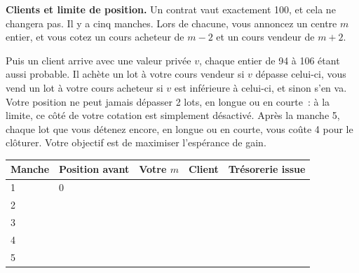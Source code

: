 \begin{question}\label{iq:iv2:played-games:8}
\textbf{Clients et limite de position.} Un contrat vaut exactement 100, et cela ne changera pas. Il y a cinq manches. Lors de chacune, vous annoncez un centre $m$ entier, et vous cotez un cours acheteur de $m - 2$ et un cours vendeur de $m + 2$.

Puis un client arrive avec une valeur privée $v$, chaque entier de 94 à 106 étant aussi probable. Il achète un lot à votre cours vendeur si $v$ dépasse celui-ci, vous vend un lot à votre cours acheteur si $v$ est inférieure à celui-ci, et sinon s'en va. Votre position ne peut jamais dépasser 2 lots, en longue ou en courte~: à la limite, ce côté de votre cotation est simplement désactivé. Après la manche 5, chaque lot que vous détenez encore, en longue ou en courte, vous coûte 4 pour le clôturer. Votre objectif est de maximiser l'espérance de gain.

\medskip
\begin{tabular}{@{}l|l|l|l|l@{}}
Manche & Position avant & Votre $m$ & Client & Trésorerie issue \\ \hline
1 & 0 & & & \\[8pt]\hline
2 & & & & \\[8pt]\hline
3 & & & & \\[8pt]\hline
4 & & & & \\[8pt]\hline
5 & & & & \\[8pt]\hline
\end{tabular}
\end{question}
\vfill\clearpage

